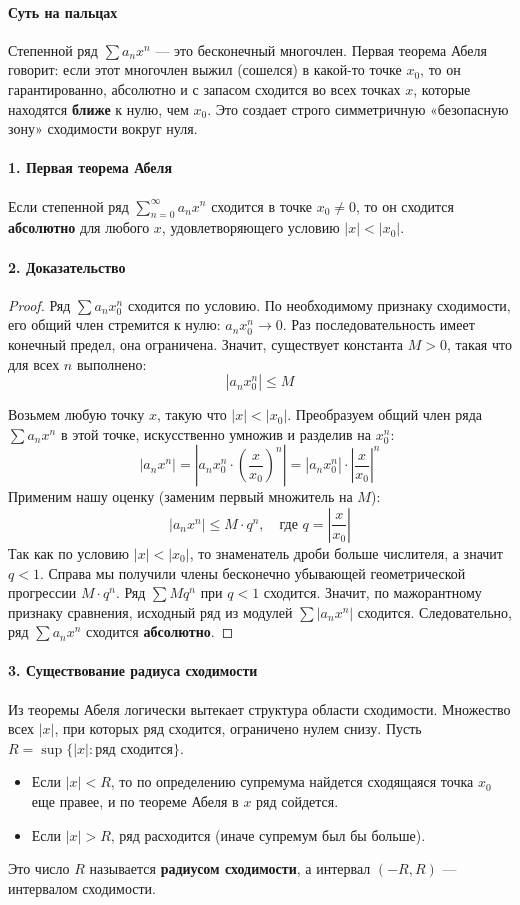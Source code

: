 \paragraph{Суть на пальцах}
Степенной ряд $\sum a_n x^n$ — это бесконечный многочлен. Первая теорема Абеля говорит: если этот многочлен выжил (сошелся) в какой-то точке $x_0$, то он гарантированно, абсолютно и с запасом сходится во всех точках $x$, которые находятся \textbf{ближе} к нулю, чем $x_0$. Это создает строго симметричную «безопасную зону» сходимости вокруг нуля.

\paragraph{1. Первая теорема Абеля}
Если степенной ряд $\sum_{n=0}^{\infty} a_n x^n$ сходится в точке $x_0 \ne 0$, то он сходится \textbf{абсолютно} для любого $x$, удовлетворяющего условию $|x| < |x_0|$.

\paragraph{2. Доказательство}
\begin{proof}
Ряд $\sum a_n x_0^n$ сходится по условию. По необходимому признаку сходимости, его общий член стремится к нулю: $a_n x_0^n \to 0$. Раз последовательность имеет конечный предел, она ограничена. Значит, существует константа $M > 0$, такая что для всех $n$ выполнено:
$$ |a_n x_0^n| \le M $$

Возьмем любую точку $x$, такую что $|x| < |x_0|$. Преобразуем общий член ряда $\sum a_n x^n$ в этой точке, искусственно умножив и разделив на $x_0^n$:
$$ |a_n x^n| = \left| a_n x_0^n \cdot \left(\frac{x}{x_0}\right)^n \right| = |a_n x_0^n| \cdot \left| \frac{x}{x_0}\right|^n $$
Применим нашу оценку (заменим первый множитель на $M$):
$$ |a_n x^n| \le M \cdot q^n, \quad \text{где } q = \left| \frac{x}{x_0} \right| $$
Так как по условию $|x| < |x_0|$, то знаменатель дроби больше числителя, а значит $q < 1$. 
Справа мы получили члены бесконечно убывающей геометрической прогрессии $M \cdot q^n$. Ряд $\sum M q^n$ при $q<1$ сходится. Значит, по мажорантному признаку сравнения, исходный ряд из модулей $\sum |a_n x^n|$ сходится. Следовательно, ряд $\sum a_n x^n$ сходится \textbf{абсолютно}.
\end{proof}

\paragraph{3. Существование радиуса сходимости}
Из теоремы Абеля логически вытекает структура области сходимости. Множество всех $|x|$, при которых ряд сходится, ограничено нулем снизу. Пусть $R = \sup \{ |x| : \text{ряд сходится} \}$.
\begin{itemize}
    \item Если $|x| < R$, то по определению супремума найдется сходящаяся точка $x_0$ еще правее, и по теореме Абеля в $x$ ряд сойдется.
    \item Если $|x| > R$, ряд расходится (иначе супремум был бы больше).
\end{itemize}
Это число $R$ называется \textbf{радиусом сходимости}, а интервал $(-R, R)$ — интервалом сходимости.


